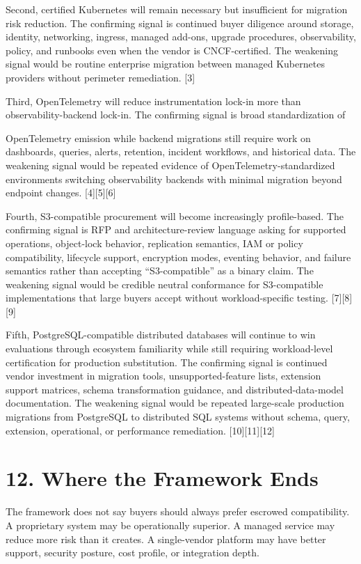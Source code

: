\documentclass[11pt]{article}
\begin{document}
Second, certified Kubernetes will remain necessary but insufficient for migration risk reduction. The confirming signal is continued buyer diligence around storage, identity, networking, ingress, managed add-ons, upgrade procedures, observability, policy, and runbooks even when the vendor is CNCF-certified. The weakening signal would be routine enterprise migration between managed Kubernetes providers without perimeter remediation. {[}3{]}

Third, OpenTelemetry will reduce instrumentation lock-in more than observability-backend lock-in. The confirming signal is broad standardization of

OpenTelemetry emission while backend migrations still require work on dashboards, queries, alerts, retention, incident workflows, and historical data. The weakening signal would be repeated evidence of OpenTelemetry-standardized environments switching observability backends with minimal migration beyond endpoint changes. {[}4{]}{[}5{]}{[}6{]}

Fourth, S3-compatible procurement will become increasingly profile-based. The confirming signal is RFP and architecture-review language asking for supported operations, object-lock behavior, replication semantics, IAM or policy compatibility, lifecycle support, encryption modes, eventing behavior, and failure semantics rather than accepting ``S3-compatible'' as a binary claim. The weakening signal would be credible neutral conformance for S3-compatible implementations that large buyers accept without workload-specific testing. {[}7{]}{[}8{]}{[}9{]}

Fifth, PostgreSQL-compatible distributed databases will continue to win evaluations through ecosystem familiarity while still requiring workload-level certification for production substitution. The confirming signal is continued vendor investment in migration tools, unsupported-feature lists, extension support matrices, schema transformation guidance, and distributed-data-model documentation. The weakening signal would be repeated large-scale production migrations from PostgreSQL to distributed SQL systems without schema, query, extension, operational, or performance remediation. {[}10{]}{[}11{]}{[}12{]}

\section{12. Where the Framework Ends}\label{where-the-framework-ends}

The framework does not say buyers should always prefer escrowed compatibility. A proprietary system may be operationally superior. A managed service may reduce more risk than it creates. A single-vendor platform may have better support, security posture, cost profile, or integration depth.
\end{document}
